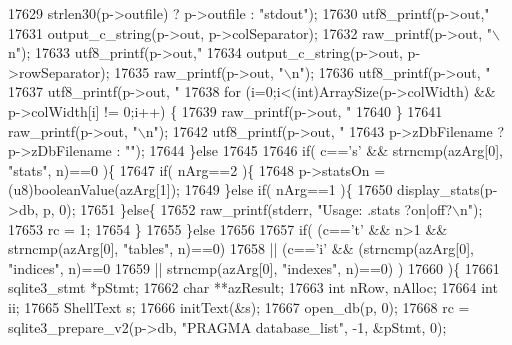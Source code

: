 \begin{DoxyCode}
{{{{{{{{{{{{{{{{{{{{{{{{{{{{{{{{{{{{{{{{{{{{{{{{{{{{{{{{{{{{{{{{{{{{{{{{{{{{{{{{{{{{{{{{{{{{{{{{{{{{{{{{{{{{{{{{{{{{{{{{{{{{{{{{{17629             strlen30(p->outfile) ? p->outfile : \textcolor{stringliteral}{"stdout"});
17630     utf8_printf(p->out,\textcolor{stringliteral}{"%
17631       output_c_string(p->out, p->colSeparator);
17632       raw_printf(p->out, \textcolor{stringliteral}{"\(\backslash\)n"});
17633     utf8_printf(p->out,\textcolor{stringliteral}{"%
17634       output_c_string(p->out, p->rowSeparator);
17635       raw_printf(p->out, \textcolor{stringliteral}{"\(\backslash\)n"});
17636     utf8_printf(p->out, \textcolor{stringliteral}{"%
17637     utf8_printf(p->out, \textcolor{stringliteral}{"%
17638     \textcolor{keywordflow}{for} (i=0;i<(int)ArraySize(p->colWidth) && p->colWidth[i] != 0;i++) \{
17639       raw_printf(p->out, \textcolor{stringliteral}{"%
17640     \}
17641     raw_printf(p->out, \textcolor{stringliteral}{"\(\backslash\)n"});
17642     utf8_printf(p->out, \textcolor{stringliteral}{"%
17643                 p->zDbFilename ? p->zDbFilename : \textcolor{stringliteral}{""});
17644   \}\textcolor{keywordflow}{else}
17645 
17646   \textcolor{keywordflow}{if}( c==\textcolor{charliteral}{'s'} && strncmp(azArg[0], \textcolor{stringliteral}{"stats"}, n)==0 )\{
17647     \textcolor{keywordflow}{if}( nArg==2 )\{
17648       p->statsOn = (u8)booleanValue(azArg[1]);
17649     \}\textcolor{keywordflow}{else} \textcolor{keywordflow}{if}( nArg==1 )\{
17650       display_stats(p->db, p, 0);
17651     \}\textcolor{keywordflow}{else}\{
17652       raw_printf(stderr, \textcolor{stringliteral}{"Usage: .stats ?on|off?\(\backslash\)n"});
17653       rc = 1;
17654     \}
17655   \}\textcolor{keywordflow}{else}
17656 
17657   \textcolor{keywordflow}{if}( (c==\textcolor{charliteral}{'t'} && n>1 && strncmp(azArg[0], \textcolor{stringliteral}{"tables"}, n)==0)
17658    || (c==\textcolor{charliteral}{'i'} && (strncmp(azArg[0], \textcolor{stringliteral}{"indices"}, n)==0
17659                  || strncmp(azArg[0], \textcolor{stringliteral}{"indexes"}, n)==0) )
17660   )\{
17661     sqlite3_stmt *pStmt;
17662     \textcolor{keywordtype}{char} **azResult;
17663     \textcolor{keywordtype}{int} nRow, nAlloc;
17664     \textcolor{keywordtype}{int} ii;
17665     ShellText s;
17666     initText(&s);
17667     open_db(p, 0);
17668     rc = sqlite3_prepare_v2(p->db, \textcolor{stringliteral}{"PRAGMA database\_list"}, -1, &pStmt, 0);
}}}}}}}}}}}}}}}}}}}}}}}}}}}}}}}}}}}}}}}}}}}}}}}}}}}}}}}}}}}}}}}}}}}}}}}}}}}}}}}}}}}}}}}}}}}}}}}}}}}}}}}}}}}}}}}}}}}}}}}}}}}}}}}}}}}}}}}
\end{DoxyCode}
